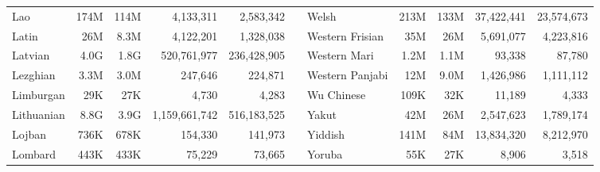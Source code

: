 \begin{table*}[t!]
{\begin{tabular}{@{}lrrrrclrrrr@{}}
            Lao                       & 174M                     & 114M                      & 4,133,311                & 2,583,342                 &                          & Welsh                     & 213M                     & 133M                      & 37,422,441               & 23,574,673                \\
            Latin                     & 26M                      & 8.3M                      & 4,122,201                & 1,328,038                 &                          & Western Frisian           & 35M                      & 26M                       & 5,691,077                & 4,223,816                 \\
            Latvian                   & 4.0G                     & 1.8G                      & 520,761,977              & 236,428,905               &                          & Western Mari              & 1.2M                     & 1.1M                      & 93,338                   & 87,780                    \\
            Lezghian                  & 3.3M                     & 3.0M                      & 247,646                  & 224,871                   &                          & Western Panjabi           & 12M                      & 9.0M                      & 1,426,986                & 1,111,112                 \\
            Limburgan                 & 29K                      & 27K                       & 4,730                    & 4,283                     &                          & Wu Chinese                & 109K                     & 32K                       & 11,189                   & 4,333                     \\
            Lithuanian                & 8.8G                     & 3.9G                      & 1,159,661,742            & 516,183,525               &                          & Yakut                     & 42M                      & 26M                       & 2,547,623                & 1,789,174                 \\
            Lojban                    & 736K                     & 678K                      & 154,330                  & 141,973                   &                          & Yiddish                   & 141M                     & 84M                       & 13,834,320               & 8,212,970                 \\
            Lombard                   & 443K                     & 433K                      & 75,229                   & 73,665                    &                          & Yoruba                    & 55K                      & 27K                       & 8,906                    & 3,518                     \\

\end{tabular}}
\end{table*}
